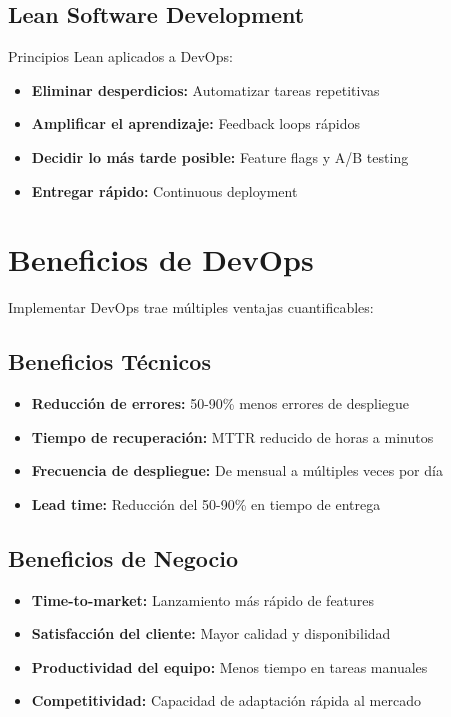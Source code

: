 \documentclass[12pt,a4paper]{article}
\begin{document}
\subsection{Lean Software Development}
Principios Lean aplicados a DevOps:
\begin{itemize}
    \item \textbf{Eliminar desperdicios:} Automatizar tareas repetitivas
    \item \textbf{Amplificar el aprendizaje:} Feedback loops rápidos
    \item \textbf{Decidir lo más tarde posible:} Feature flags y A/B testing
    \item \textbf{Entregar rápido:} Continuous deployment
\end{itemize}

\section{Beneficios de DevOps}
Implementar DevOps trae múltiples ventajas cuantificables:

\subsection{Beneficios Técnicos}
\begin{itemize}
    \item \textbf{Reducción de errores:} 50-90\% menos errores de despliegue
    \item \textbf{Tiempo de recuperación:} MTTR reducido de horas a minutos
    \item \textbf{Frecuencia de despliegue:} De mensual a múltiples veces por día
    \item \textbf{Lead time:} Reducción del 50-90\% en tiempo de entrega
\end{itemize}

\subsection{Beneficios de Negocio}
\begin{itemize}
    \item \textbf{Time-to-market:} Lanzamiento más rápido de features
    \item \textbf{Satisfacción del cliente:} Mayor calidad y disponibilidad
    \item \textbf{Productividad del equipo:} Menos tiempo en tareas manuales
    \item \textbf{Competitividad:} Capacidad de adaptación rápida al mercado
\end{itemize}
\end{document}

